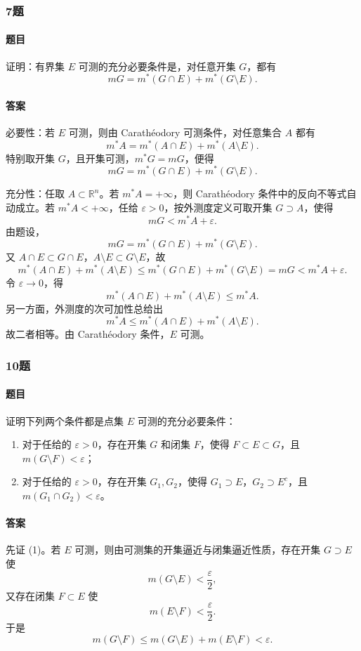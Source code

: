 \documentclass{article}
\newcommand{\eps}{\varepsilon}
\begin{document}
	\subsubsection*{7题}
	\paragraph{题目} 证明：有界集 $E$ 可测的充分必要条件是，对任意开集 $G$，都有
	\[
	mG=m^*(G\cap E)+m^*(G\setminus E).
	\]
	
	\paragraph{答案} 必要性：若 $E$ 可测，则由 Carath\'{e}odory 可测条件，对任意集合 $A$ 都有
	\[
	m^*A=m^*(A\cap E)+m^*(A\setminus E).
	\]
	特别取开集 $G$，且开集可测，$m^*G=mG$，便得
	\[
	mG=m^*(G\cap E)+m^*(G\setminus E).
	\]
	
	充分性：任取 $A\subset\mathbb{R}^n$。若 $m^*A=+\infty$，则 Carath\'{e}odory 条件中的反向不等式自动成立。若 $m^*A<+\infty$，任给 $\eps>0$，按外测度定义可取开集 $G\supset A$，使得
	\[
	mG<m^*A+\eps.
	\]
	由题设，
	\[
	mG=m^*(G\cap E)+m^*(G\setminus E).
	\]
	又 $A\cap E\subset G\cap E$，$A\setminus E\subset G\setminus E$，故
	\[
	m^*(A\cap E)+m^*(A\setminus E)
	\le m^*(G\cap E)+m^*(G\setminus E)=mG<m^*A+\eps.
	\]
	令 $\eps\to0$，得
	\[
	m^*(A\cap E)+m^*(A\setminus E)
	\le m^*A.
	\]
	另一方面，外测度的次可加性总给出
	\[
	m^*A\le m^*(A\cap E)+m^*(A\setminus E).
	\]
	故二者相等。由 Carath\'{e}odory 条件，$E$ 可测。
	
	\subsubsection*{10题}
	\paragraph{题目} 证明下列两个条件都是点集 $E$ 可测的充分必要条件：
	\begin{enumerate}[label=(\arabic*)]
		\item 对于任给的 $\eps>0$，存在开集 $G$ 和闭集 $F$，使得 $F\subset E\subset G$，且 $m(G\setminus F)<\eps$；
		\item 对于任给的 $\eps>0$，存在开集 $G_1,G_2$，使得 $G_1\supset E$，$G_2\supset E^c$，且 $m(G_1\cap G_2)<\eps$。
	\end{enumerate}
	
	\paragraph{答案} 先证 (1)。若 $E$ 可测，则由可测集的开集逼近与闭集逼近性质，存在开集 $G\supset E$ 使
	\[
	m(G\setminus E)<\frac{\eps}{2},
	\]
	又存在闭集 $F\subset E$ 使
	\[
	m(E\setminus F)<\frac{\eps}{2}.
	\]
	于是
	\[
	m(G\setminus F)\le m(G\setminus E)+m(E\setminus F)<\eps.
	\]
	
\end{document}
